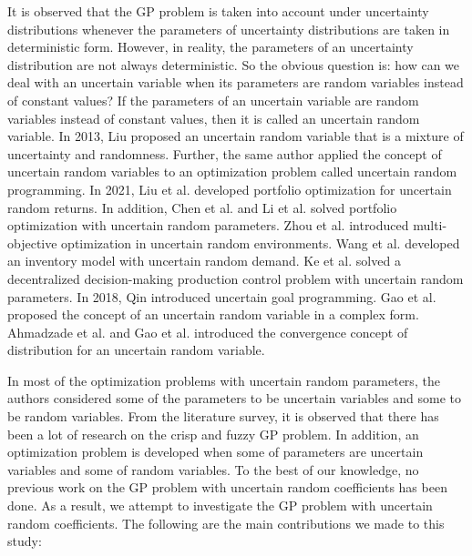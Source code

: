 \par It is observed that the GP problem is taken into account under uncertainty distributions whenever the parameters of uncertainty distributions are taken in deterministic form. However, in reality, the parameters of an uncertainty distribution are not always deterministic. So the obvious question is: how can we deal with an uncertain variable when its parameters are random variables instead of constant values? If the parameters of an uncertain variable are random variables instead of constant values, then it is called an uncertain random variable. In 2013, Liu \cite{Liu 2013a} proposed an uncertain random variable that is a mixture of uncertainty and randomness. Further, the same author \cite{Liu 2013b} applied the concept of uncertain random variables to an optimization problem called uncertain random programming. In 2021, Liu et al. \cite{Liu 2021} developed portfolio optimization for uncertain random returns. In addition, Chen et al. \cite{Chen 2021} and Li et al. \cite{Li 2022} solved portfolio optimization with uncertain random parameters. Zhou et al. \cite{Zhou 2014} introduced multi-objective optimization in uncertain random environments. Wang et al. \cite{Wang 2015} developed an inventory model with uncertain random demand. Ke et al. \cite{Ke 2015} solved a decentralized decision-making production control problem with uncertain random parameters. In 2018, Qin \cite{Qin 2018} introduced uncertain goal programming. Gao et al. \cite{Gao 2018b} proposed the concept of an uncertain random variable in a complex form. Ahmadzade et al. \cite{Ahmadzade 2020} and Gao et al. \cite{Gao 2018a} introduced the convergence concept of distribution for an uncertain random variable.
\par In most of the optimization problems with uncertain random parameters, the authors considered some of the parameters to be uncertain variables and some to be random variables. From the literature survey, it is observed that there has been a lot of research on the crisp and fuzzy GP problem. In addition, an optimization problem is developed when some of parameters are uncertain variables and some of random variables. To the best of our knowledge, no previous work on the GP problem with uncertain random coefficients has been done. As a result, we attempt to investigate the GP problem with uncertain random coefficients. The following are the main contributions we made to this study: 
